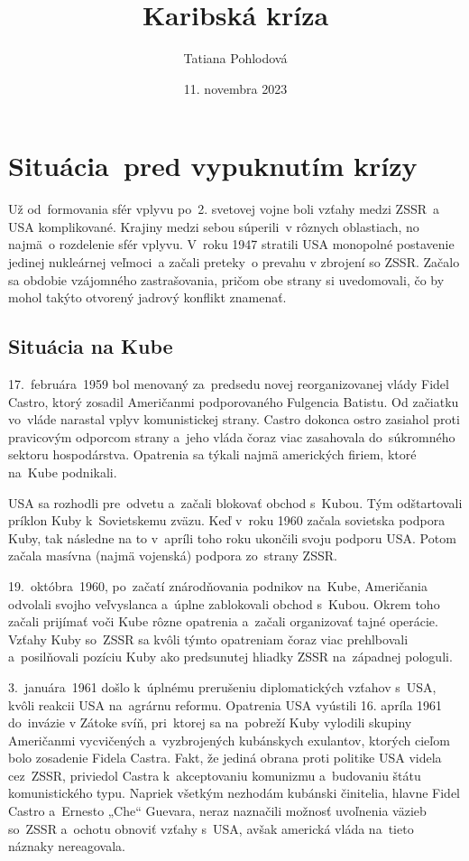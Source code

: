 \documentclass[a4paper]{article}
\title{Karibská kríza}
\author{Tatiana Pohlodová}
\date{11. novembra 2023}
\begin{document}
\shorthandoff{-}


\thispagestyle{empty}

\setcounter{page}{1}
\maketitle

\section{Situácia~pred vypuknutím krízy}
Už od~formovania sfér vplyvu po~2. svetovej vojne boli vzťahy medzi ZSSR~a USA komplikované. Krajiny medzi sebou súperili~v rôznych oblastiach, no najmä~o rozdelenie sfér vplyvu. V~roku 1947 stratili USA monopolné postavenie jedinej nukleárnej veľmoci~a začali preteky~o prevahu v zbrojení so ZSSR. Začalo sa obdobie vzájomného zastrašovania, pričom obe strany si uvedomovali, čo by mohol takýto otvorený jadrový konflikt znamenať.

\subsection{Situácia na Kube}
17.~februára~1959 bol menovaný za~predsedu novej reorganizovanej vlády Fidel Castro, ktorý zosadil Američanmi podporovaného Fulgencia Batistu. Od začiatku vo~vláde narastal vplyv komunistickej strany. \cite{mintomid} Castro dokonca ostro zasiahol proti pravicovým odporcom strany a~jeho vláda čoraz viac zasahovala do~súkromného sektoru hospodárstva. Opatrenia sa týkali najmä amerických firiem, ktoré na~Kube podnikali.

USA sa rozhodli pre~odvetu a~začali blokovať obchod s~Kubou. Tým odštartovali príklon Kuby k~Sovietskemu zväzu. Keď v~roku 1960 začala sovietska podpora Kuby, tak následne na to v~apríli toho roku ukončili svoju podporu USA. Potom začala masívna (najmä vojenská) podpora zo~strany ZSSR.

19.~októbra~1960, po~začatí znárodňovania podnikov na~Kube, Američania odvolali svojho veľvyslanca a~úplne zablokovali obchod s~Kubou. Okrem toho začali prijímať voči Kube rôzne opatrenia a~začali organizovať tajné operácie. Vzťahy Kuby so~ZSSR sa kvôli týmto opatreniam čoraz viac prehlbovali a~posilňovali pozíciu Kuby ako predsunutej hliadky ZSSR na~západnej pologuli. \cite{mintomid}

3.~januára~1961 došlo k~úplnému prerušeniu diplomatických vzťahov s~USA, kvôli reakcii USA na~agrárnu reformu. Opatrenia USA vyústili 16. apríla 1961 do~invázie v Zátoke svíň, pri~ktorej sa na~pobreží Kuby vylodili skupiny Američanmi vycvičených a~vyzbrojených kubánskych exulantov, ktorých cieľom bolo zosadenie Fidela Castra. \cite{13days} Fakt, že jediná obrana proti politike USA videla cez~ZSSR, priviedol Castra k~akceptovaniu komunizmu a~budovaniu štátu komunistického typu. Napriek všetkým nezhodám kubánski činitelia, hlavne Fidel Castro a~Ernesto „Che“ Guevara, neraz naznačili možnosť uvoľnenia väzieb so~ZSSR a~ochotu obnoviť vzťahy s~USA, avšak americká vláda na~tieto náznaky nereagovala.
\end{document}
